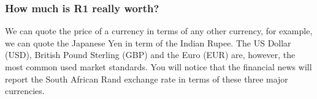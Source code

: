             \subsubsection{ How much is R1 really worth?}
            \nopagebreak
            
        
        \label{m39335*id66752}We can quote the price of a currency in terms of any other currency, for example, we can quote the Japanese Yen in term of the Indian Rupee. The US Dollar (USD), British Pound Sterling (GBP) and the Euro (EUR) are, however, the most common used market standards. You will notice that the financial news will report the South African Rand exchange rate in terms of these three major currencies.\par 
        
    
      
    
    \setlength\mytablespace{6\tabcolsep}
    \addtolength\mytablespace{4\arrayrulewidth}
    \setlength\mytablewidth{\linewidth}
        
    
    \setlength\mytableroom{\mytablewidth}
    \addtolength\mytableroom{-\mytablespace}
    
    \setlength\myfixedwidth{0pt}
    \setlength\mystarwidth{\mytableroom}
        \addtolength\mystarwidth{-\myfixedwidth}
        \divide{}
        
